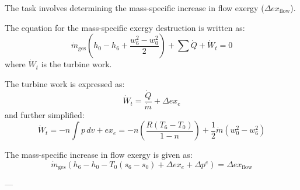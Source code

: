 The task involves determining the mass-specific increase in flow exergy (\( \Delta ex_{\text{flow}} \)).

The equation for the mass-specific exergy destruction is written as:  
\[
\dot{m}_{\text{ges}} \left( h_0 - h_6 + \frac{w_6^2 - w_0^2}{2} \right) + \sum \dot{Q} + \dot{W}_t = 0
\]  
where \( \dot{W}_t \) is the turbine work.  

The turbine work is expressed as:  
\[
\dot{W}_t = \frac{\dot{Q}}{\dot{m}} + \Delta ex_e
\]  
and further simplified:  
\[
\dot{W}_t = -n \int p \, dv + ex_e = -n \left( \frac{R(T_6 - T_0)}{1 - n} \right) + \frac{1}{2} \dot{m} (w_0^2 - w_6^2)
\]

The mass-specific increase in flow exergy is given as:  
\[
\dot{m}_{\text{ges}} \left( h_6 - h_0 - T_0 (s_6 - s_0) + \Delta ex_e + \Delta p^e \right) = \Delta ex_{\text{flow}}
\]

---